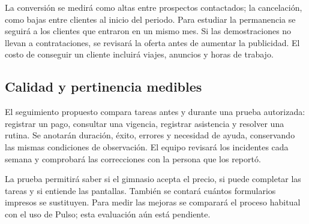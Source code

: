 La conversión se medirá como altas entre prospectos contactados; la cancelación,
como bajas entre clientes al inicio del periodo. Para estudiar la permanencia
se seguirá a los clientes que entraron en un mismo mes. Si las demostraciones
no llevan a contrataciones, se revisará la oferta antes de aumentar la
publicidad. El costo de conseguir un cliente incluirá viajes, anuncios y horas
de trabajo.

\subsection{Calidad y pertinencia medibles}

El seguimiento propuesto compara tareas antes y durante una prueba autorizada:
registrar un pago, consultar una vigencia, registrar asistencia y resolver una
rutina. Se anotarán duración, éxito, errores y necesidad de ayuda, conservando
las mismas condiciones de observación. El equipo revisará los incidentes cada
semana y comprobará las correcciones con la persona que los reportó.

La prueba permitirá saber si el gimnasio acepta el precio, si puede completar
las tareas y si entiende las pantallas. También se contará cuántos formularios
impresos se sustituyen. Para medir las mejoras se comparará el proceso habitual
con el uso de Pulso; esta evaluación aún está pendiente.
